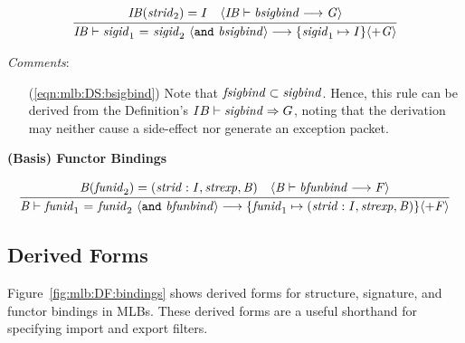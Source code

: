 \begin{equation}
\label{eqn:mlb:DS:bsigbind}
\judge{
\mit{IB}(\mit{strid}_2) = I \quad 
\langle\mit{IB} \vdash \mit{bsigbind} \longrightarrow \mit{G}\rangle
}{
\mit{IB} \vdash \mit{sigid}_1 ~\mtt{=}~ \mit{sigid}_2 ~\langle\mtt{and}~\mit{bsigbind}\rangle \longrightarrow 
\{\mit{sigid}_1 \mapsto I\} \langle+ \mit{G}\rangle
}
\end{equation}

\noindent
\textit{Comments}:
\begin{itemize}
\item[(\ref{eqn:mlb:DS:bsigbind})] Note that $\mit{fsigbind} \subset
\mit{sigbind}$.  Hence, this rule can be derived from the
Definition's $IB \vdash \mit{sigbind} \Rightarrow G$, noting that
the derivation may neither cause a side-effect nor generate an
exception packet.
\end{itemize}

{\large\noindent
\textbf{(Basis) Functor Bindings} \hfill 
{}
}

\begin{equation}
\judge{
\mit{B}(\mit{funid}_2) = (\mit{strid}:\mit{I},\mit{strexp},\mit{B}) \quad
\langle\mit{B} \vdash \mit{bfunbind} \longrightarrow \mit{F}\rangle
}{
\mit{B} \vdash \mit{funid}_1 ~\mtt{=}~ \mit{funid}_2 ~\langle\mtt{and}~\mit{bfunbind}\rangle \longrightarrow 
\{\mit{funid}_1 \mapsto (\mit{strid}:\mit{I},\mit{strexp},\mit{B})\} \langle+ \mit{F}\rangle
}
\end{equation}


\subsection{Derived Forms}
\label{sec:mlb:DerivedForms}

Figure~\ref{fig:mlb:DF:bindings} shows derived forms for structure,
signature, and functor bindings in MLBs.  These derived forms are
a useful shorthand for specifying import and export filters.

